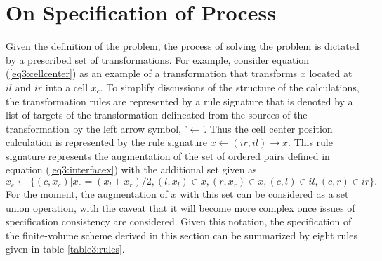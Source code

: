 \documentclass[10pt,epsf,letterpaper,twoside]{book}
\begin{document}
\section{On Specification of Process}

Given the definition of the problem, the process of solving the
problem is dictated by a prescribed set of transformations.  For
example, consider equation (\ref{eq3:cellcenter}) as an example of a
transformation that transforms $x$ located at $il$ and $ir$ into a
cell $x_c$.  To simplify discussions of the structure of the
calculations, the transformation rules are represented by a rule
signature that is denoted by a list of targets of the transformation
delineated from the sources of the transformation by the left arrow
symbol, '$\leftarrow$'.  Thus the cell center position calculation is
represented by the rule signature $x \leftarrow (ir,il)\rightarrow x$.
This rule signature represents the augmentation of the set of ordered
pairs defined in equation (\ref{eq3:interfacex}) with the additional
set given as
\begin{equation}
x_c \leftarrow\lbrace (c, x_c) |  x_c = (x_l + x_r)/2,
                               (l,x_l) \in x, (r,x_r) \in x, 
                               (c,l) \in il, (c,r) \in ir \rbrace.
\end{equation}
For the moment, the augmentation of $x$ with this set can be
considered as a set union operation, with the caveat that it will
become more complex once issues of specification consistency are
considered.  Given this notation, the specification of the
finite-volume scheme derived in this section can be summarized by
eight rules given in table \ref{table3:rules}.
\end{document}
